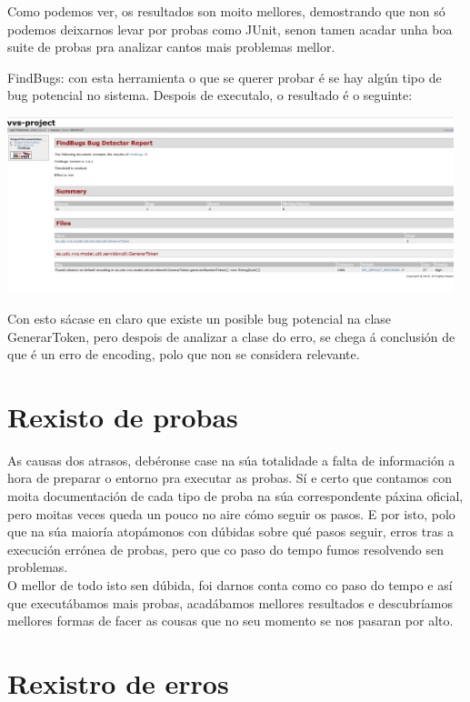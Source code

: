 \documentclass[DIV=calc,paper=a4,fontsize=11pt,onecolumn]{scrartcl}	 %
\begin{document}
\begin{itemize}
	  	  Como podemos ver, os resultados son moito mellores, demostrando que non só podemos deixarnos levar por probas como JUnit, senon tamen acadar unha boa suite de probas pra analizar cantos mais problemas mellor.
	  	  
	  	  \subitem FindBugs: con esta herramienta o que se querer probar é se hay algún tipo de bug potencial no sistema. Despois de executalo, o resultado é o seguinte:
	  	  
	  	  
	  	  \includegraphics[width=13cm]{Imagenes/findbugs.png}
	  	  
	  	  Con esto sácase en claro que existe un posible bug potencial na clase GenerarToken, pero despois de analizar a clase do erro, se chega á conclusión de que é un erro de encoding, polo que non se considera relevante.
  \end{itemize}

\section{Rexisto de probas}

As causas dos atrasos, debéronse case na súa totalidade a falta de información a hora de preparar o entorno pra executar as probas. Sí e certo que contamos con moita documentación de cada tipo de proba na súa correspondente páxina oficial, pero moitas veces queda un pouco no aire cómo seguir os pasos. E por isto, polo que na súa maioría atopámonos con dúbidas sobre qué pasos seguir, erros tras a execución errónea de probas, pero que co paso do tempo fumos resolvendo sen problemas. \\

O mellor de todo isto sen dúbida, foi darnos conta como co paso do tempo e así que executábamos mais probas, acadábamos mellores resultados e descubríamos mellores formas de facer as cousas que no seu momento se nos pasaran por alto. 

\section{Rexistro de erros}
\end{document}
